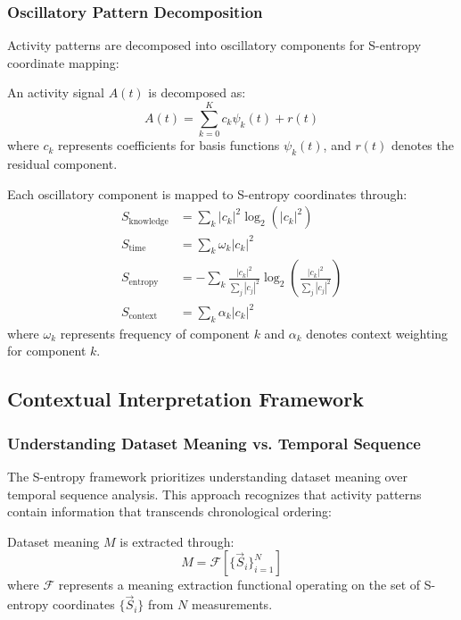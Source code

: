 \subsubsection{Oscillatory Pattern Decomposition}

Activity patterns are decomposed into oscillatory components for S-entropy coordinate mapping:

\begin{definition}
An activity signal $A(t)$ is decomposed as:
\begin{equation}
A(t) = \sum_{k=0}^{K} c_k \psi_k(t) + r(t)
\end{equation}
where $c_k$ represents coefficients for basis functions $\psi_k(t)$, and $r(t)$ denotes the residual component.
\end{definition}

\begin{definition}
Each oscillatory component is mapped to S-entropy coordinates through:
\begin{align}
S_{\text{knowledge}} &= \sum_k |c_k|^2 \log_2(|c_k|^2) \\
S_{\text{time}} &= \sum_k \omega_k |c_k|^2 \\
S_{\text{entropy}} &= -\sum_k \frac{|c_k|^2}{\sum_j |c_j|^2} \log_2\left(\frac{|c_k|^2}{\sum_j |c_j|^2}\right) \\
S_{\text{context}} &= \sum_k \alpha_k |c_k|^2
\end{align}
where $\omega_k$ represents frequency of component $k$ and $\alpha_k$ denotes context weighting for component $k$.
\end{definition}

\subsection{Contextual Interpretation Framework}

\subsubsection{Understanding Dataset Meaning vs. Temporal Sequence}

The S-entropy framework prioritizes understanding dataset meaning over temporal sequence analysis. This approach recognizes that activity patterns contain information that transcends chronological ordering:

\begin{definition}
Dataset meaning $M$ is extracted through:
\begin{equation}
M = \mathcal{F}[\{\vec{S}_i\}_{i=1}^N]
\end{equation}
where $\mathcal{F}$ represents a meaning extraction functional operating on the set of S-entropy coordinates $\{\vec{S}_i\}$ from $N$ measurements.
\end{definition}

